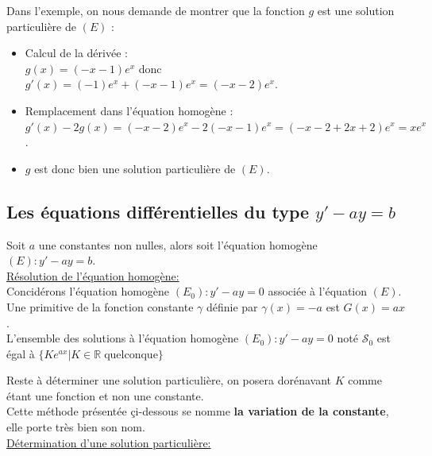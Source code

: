 \documentclass[french]{book}
\newcommand{\cals}{\mathscr{S}}
\begin{document}
\begin{exemple}
Dans l'exemple, on nous demande de montrer que la fonction $g$ est une solution particulière de $(E)$ :
\begin{itemize}
   \item Calcul de la dérivée : \\
   \hspace*{0.3cm} $g(x)=(-x-1)e^x$ donc $g'(x) =(-1)e^x+(-x-1)e^x =(-x-2)e^x$.
   \item Remplacement dans l'équation homogène : \\
   \hspace*{0.3cm} $g'(x)-2g(x) =(-x-2)e^x-2(-x-1)e^x =(-x-2+2x+2)e^x = xe^x$.
   \item $g$ est donc bien une solution particulière de $(E)$.
\end{itemize}
\end{exemple}




\subsection{Les équations différentielles du type $y'-ay=b$ }

Soit $a$ une constantes non nulles, alors soit l'équation homogène $(E): y'-ay=b $. \\

\underline{Résolution de l'équation homogène:}\\

Concidérons l'équation homogène $(E_0): y'-ay=0 $ associée à l'équation $(E)$.\\

Une primitive de la fonction constante $\gamma$ définie par $\gamma(x)=-a$ est $G(x)=ax$. \\

L'ensemble des solutions à l'équation homogène $(E_0): y'-ay=0 $ noté $\cals_0$ est égal à $\{Ke^{ax} \vert  K\in \mathbb{R} \; \text{quelconque} \}$

Reste à déterminer une solution particulière, on posera dorénavant $K$ comme étant une fonction et non une constante.\\

Cette méthode présentée çi-dessous se nomme \textbf{la variation de la constante}, elle porte très bien son nom.\\

\underline{Détermination d'une solution particulière:}\\
\end{document}

